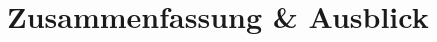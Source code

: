 \documentclass[./\jobname.tex]{subfiles}
\begin{document}
\chapter{Zusammenfassung \& Ausblick}
\end{document}

